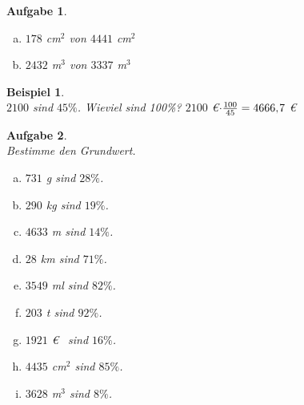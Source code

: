 \documentclass[12pt,fleqn]{article}
\theoremstyle{aufg}
\newtheorem{aufgabe}{Aufgabe}
\theoremstyle{bsp}
\newtheorem{beispiel}{Beispiel}
\begin{document}
\begin{flushleft}
\begin{aufgabe}
\begin{multicols}{3}
\begin{enumerate}[a)]
\item 
$178$ cm$^2$ von $4441$ cm$^2$
\item 
$2432$ m$^3$ von $3337$ m$^3$
\end{enumerate} 
\end{multicols} 
\end{aufgabe} 
\begin{beispiel} ~ \\ 
$2100$ sind $45\%$. Wieviel sind 100\%? $2100$ \euro$\cdot \frac{100}{45}= 4666,\hspace{-1pt}7$ \euro\end{beispiel} 
\begin{aufgabe} ~ \\ 
Bestimme den Grundwert.\begin{multicols}{3} 
\begin{enumerate}[a)] 
\item 
$731$ g sind $28\%$.
\item 
$290$ kg sind $19\%$.
\item 
$4633$ m sind $14\%$.
\item 
$28$ km sind $71\%$.
\item 
$3549$ ml sind $82\%$.
\item 
$203$ t sind $92\%$.
\item 
$1921$ \euro~ sind $16\%$.
\item 
$4435$ cm$^2$ sind $85\%$.
\item 
$3628$ m$^3$ sind $8\%$.
\end{enumerate} 
\end{multicols} 
\end{aufgabe} 

\end{flushleft}
\end{document}
